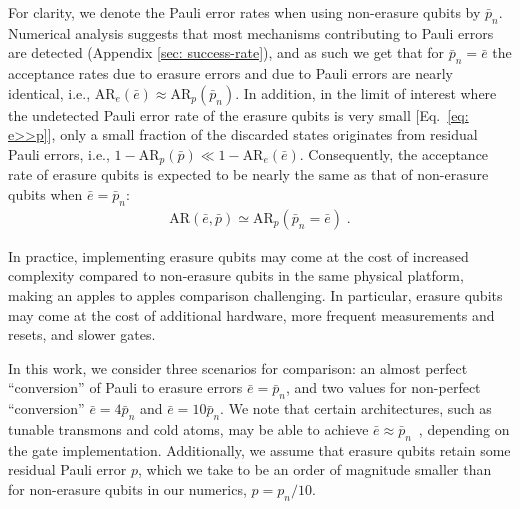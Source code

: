 \documentclass[twocolumn,
notitlepage,
aps,
prx,
floatfix,
superscriptaddress
]{revtex4-2}
\begin{document}
For clarity, we denote the Pauli error rates when using non-erasure qubits by $\bar p_n$.
Numerical analysis suggests that most mechanisms contributing to Pauli errors are detected (Appendix \ref{sec: success-rate}), and as such we get that for $\bar{p}_n=\bar{e}$ the acceptance rates due to erasure errors and due to Pauli errors are nearly identical, i.e.,
$\text{AR}_e (\bar{e}) \approx \text{AR}_p(\bar{p}_n)$. 
In addition, in the limit of interest where the undetected Pauli error rate of the erasure qubits is very small [Eq.~\eqref{eq: e>>p}], only a small fraction of the discarded states originates from residual Pauli errors, i.e.,
$1-\text{AR}_p(\bar{p}) \ll 1 - \text{AR}_e(\bar{e})$. Consequently, the acceptance rate of erasure qubits is expected to be nearly the same as that of non-erasure qubits when $\bar e = \bar p_n$:
\begin{align} \label{eq:erasure-success-rate}
    \text{AR}(\bar{e}, \bar{p}) \simeq \text{AR}_p(\bar{p}_n=\bar e)
    \;.
\end{align}

In practice, implementing erasure qubits may come at the cost of increased complexity compared to non-erasure qubits in the same physical platform, making an apples to apples comparison challenging.
In particular, erasure qubits may come at the cost of additional hardware, more frequent measurements and resets, and slower gates. 

In this work, we consider three scenarios for comparison: an almost perfect ``conversion'' of Pauli to erasure errors $\bar e=\bar p_n$, and two values for non-perfect ``conversion'' $\bar e=4\bar p_n$ and $\bar e=10\bar p_n$. We note that certain architectures, such as tunable transmons and cold atoms, may be able to achieve $\bar e\approx \bar p_n$~\cite{Wu_2022atoms, Kubica_2023}, depending on the gate implementation.
%
Additionally, we assume that erasure qubits retain some residual Pauli error $p$, which we take to be an order of magnitude smaller than for non-erasure qubits in our numerics, $p=p_n/10$. 
\end{document}
